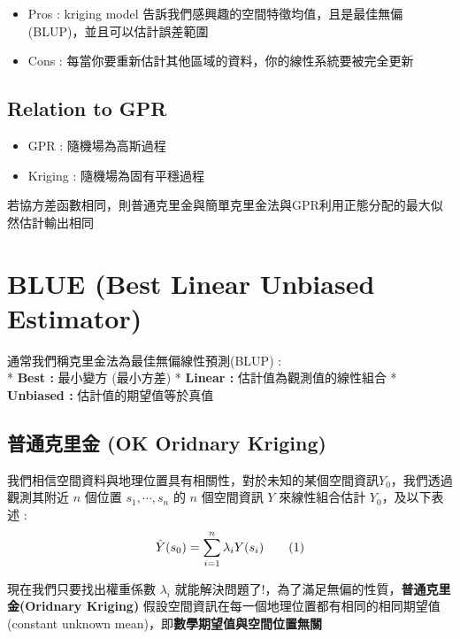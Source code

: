 \documentclass[
]{book}
\providecommand{\tightlist}{%
  \setlength{\itemsep}{0pt}\setlength{\parskip}{0pt}}
\begin{document}
\begin{itemize}
\tightlist
\item
  Pros : kriging model 告訴我們感興趣的空間特徵均值，且是最佳無偏 (BLUP)，並且可以估計誤差範圍
\item
  Cons : 每當你要重新估計其他區域的資料，你的線性系統要被完全更新
\end{itemize}

\hypertarget{relation-to-gpr}{%
\subsection*{Relation to GPR}\label{relation-to-gpr}}

\begin{itemize}
\tightlist
\item
  GPR : 隨機場為高斯過程
\item
  Kriging : 隨機場為固有平穩過程
\end{itemize}

若協方差函數相同，則普通克里金與簡單克里金法與GPR利用正態分配的最大似然估計輸出相同

\hypertarget{blue-best-linear-unbiased-estimator}{%
\section{BLUE (Best Linear Unbiased Estimator)}\label{blue-best-linear-unbiased-estimator}}

通常我們稱克里金法為最佳無偏線性預測(BLUP) :\\
* \textbf{Best :} 最小變方 (最小方差)
* \textbf{Linear :} 估計值為觀測值的線性組合
* \textbf{Unbiased :} 估計值的期望值等於真值

\hypertarget{ux666eux901aux514bux91ccux91d1-ok-oridnary-kriging}{%
\subsection{普通克里金 (OK Oridnary Kriging)}\label{ux666eux901aux514bux91ccux91d1-ok-oridnary-kriging}}

我們相信空間資料與地理位置具有相關性，對於未知的某個空間資訊\(Y_0\)，我們透過觀測其附近 \(n\) 個位置 \(s_1,\cdots,s_n\) 的 \(n\) 個空間資訊 \(Y\) 來線性組合估計 \(Y_0\)，及以下表述 :
\[
\hat Y(s_0) = \sum_{i=1}^n\lambda_iY(s_i) \tag 1
\]

現在我們只要找出權重係數 \(\lambda_i\) 就能解決問題了!，為了滿足無偏的性質，\textbf{普通克里金(Oridnary Kriging)} 假設空間資訊在每一個地理位置都有相同的相同期望值 (constant unknown mean)，即\textbf{數學期望值與空間位置無關}
\end{document}
